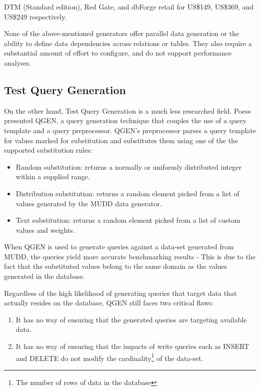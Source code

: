 \documentclass[12pt]{article}
\begin{document}
\begin{spacing}{1.9}
		DTM (Standard edition), Red Gate, and dbForge retail for US\$149, US\$369, and US\$249 respectively. 
		
		None of the above-mentioned generators offer parallel data generation or the ability to define data dependencies across relations or tables. They also require a substantial amount of effort to configure, and do not support performance analyses. 
		
		\subsection{Test Query Generation}
		On the other hand, Test Query Generation is a much less researched field. Poess\cite{Poess:2004} presented QGEN, a query generation technique that couples the use of a query template and a query preprocessor. QGEN's preprocessor parses a query template for values marked for substitution and substitutes them using one of the the supported substitution rules:
		
		\begin{itemize}
			\item Random substitution: returns a normally or uniformly distributed integer within a supplied range.
			\item Distribution substitution: returns a random element picked from a list of values generated by the MUDD data generator\cite{Stephens:2004}. 
			\item Text substitution: returns a random element picked from a list of custom values and weights.
		\end{itemize}
		
		
		When QGEN is used to generate queries against a data-set generated from MUDD, the queries yield more accurate benchmarking results - This is due to the fact that the substituted values belong to the same domain as the values generated in the database. 
		
		Regardless of the high likelihood of generating queries that target data that actually resides on the database, QGEN still faces two critical flaws:
		\begin{enumerate}
			\item It has no way of ensuring that the generated queries are targeting available data.
			\item It has no way of ensuring that the impacts of write queries such as INSERT and DELETE do not modify the cardinality\footnote{The number of rows of data in the database} of the data-set.
		\end{enumerate}
		

\end{spacing}
\end{document}
